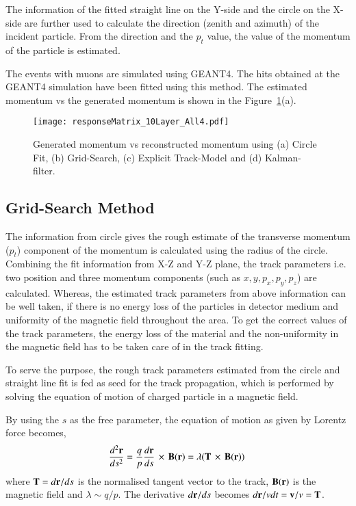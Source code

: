 The information of the fitted straight line on the Y-side and the circle
on the X-side are further used to calculate the direction (zenith and
azimuth) of the incident particle. From the direction and the $p_t$
value, the value of the momentum of the particle is estimated.

The events with muons are simulated using GEANT4. The hits obtained
at the GEANT4 simulation have been fitted using this method.
The estimated momentum vs the generated momentum is shown in the
Figure~\ref{fig:recomom}(a).
\begin{figure}[h]
  \centering
  \texttt{[image: responseMatrix\_10Layer\_All4.pdf]}
  \caption{Generated momentum vs reconstructed momentum using
    (a) Circle Fit, (b) Grid-Search, (c) Explicit Track-Model
    and (d) Kalman-filter.}
  \label{fig:recomom}
\end{figure}


\subsection{Grid-Search Method}
The information from circle gives the rough estimate of the transverse
momentum ($p_{t}$) component of the momentum is calculated using the
radius of the circle. Combining the fit information from X-Z and Y-Z
plane, the track parameters i.e. two position and three momentum
components (such as $x,y,p_{x},p_{y},p_{z}$) are calculated. Whereas, the estimated
track parameters from above information can be well taken, if there
is no energy loss of the particles in detector medium and uniformity
of the magnetic field throughout the area. To get the correct values of
the track parameters, the energy loss of the material and the
non-uniformity in the magnetic field has to be taken care of in the track
fitting.

To serve the purpose, the rough track parameters estimated from the
circle and straight line fit is fed as seed for the track
propagation, which is performed by solving the equation of motion of
charged particle in a magnetic field.

By using the $s$ as the free parameter, the equation of motion as given
by Lorentz force becomes,
\begin{equation}
  \frac{d^{2}{\bf r}}{ds^{2}}=\frac{q}{p}\frac{d{\bf r}}{ds}\,\times\,{\bf B(r)} = \lambda({\bf T}\,\times\,{\bf B(r)})~
  \label{eqn:lorentzeqn}
\end{equation}
where ${\bf T} = d{\bf r}/ds$ is the normalised tangent vector to the
track, ${\bf B(r)}$ is the magnetic field and $\lambda\sim q/p$. The
derivative $d{\bf r}/ds$ becomes $d{\bf r}/vdt = {\bf v}/v = {\bf T}$.

